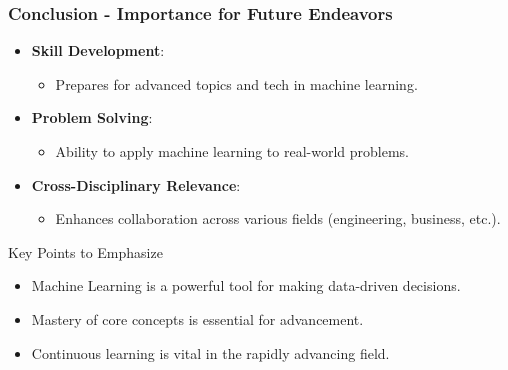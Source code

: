 \documentclass[aspectratio=169]{beamer}
\begin{document}
\begin{frame}[fragile]
    \frametitle{Conclusion - Importance for Future Endeavors}
    \begin{itemize}
        \item \textbf{Skill Development}: 
        \begin{itemize}
            \item Prepares for advanced topics and tech in machine learning.
        \end{itemize}
        \item \textbf{Problem Solving}:
        \begin{itemize}
            \item Ability to apply machine learning to real-world problems.
        \end{itemize}
        \item \textbf{Cross-Disciplinary Relevance}:
        \begin{itemize}
            \item Enhances collaboration across various fields (engineering, business, etc.).
        \end{itemize}
    \end{itemize}
    
    \begin{block}{Key Points to Emphasize}
        \begin{itemize}
            \item Machine Learning is a powerful tool for making data-driven decisions.
            \item Mastery of core concepts is essential for advancement.
            \item Continuous learning is vital in the rapidly advancing field.
        \end{itemize}
    \end{block}
\end{frame}
\end{document}
